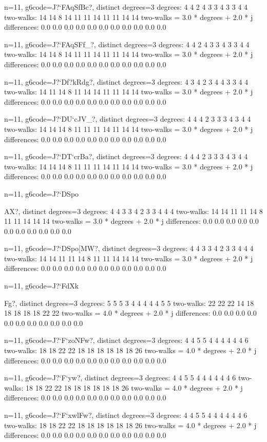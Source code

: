 {{{{{{{{{n=11, g6code=J?`FAqSfBc?, distinct degrees=3
degrees: 4 4 2 4 3 3 4 3 3 4 4 
two-walks: 14 14 8 14 11 11 14 11 11 14 14 
two-walks = 3.0 * degrees + 2.0 * j
differences: 0.0 0.0 0.0 0.0 0.0 0.0 0.0 0.0 0.0 0.0 0.0 

n=11, g6code=J?`FAqSFf_?, distinct degrees=3
degrees: 4 4 2 4 3 3 4 3 3 4 4 
two-walks: 14 14 8 14 11 11 14 11 11 14 14 
two-walks = 3.0 * degrees + 2.0 * j
differences: 0.0 0.0 0.0 0.0 0.0 0.0 0.0 0.0 0.0 0.0 0.0 

n=11, g6code=J?`Df?kRdg?, distinct degrees=3
degrees: 4 3 4 2 3 4 4 3 3 4 4 
two-walks: 14 11 14 8 11 14 14 11 11 14 14 
two-walks = 3.0 * degrees + 2.0 * j
differences: 0.0 0.0 0.0 0.0 0.0 0.0 0.0 0.0 0.0 0.0 0.0 

n=11, g6code=J?`DU`cJV_?, distinct degrees=3
degrees: 4 4 4 2 3 3 3 4 3 4 4 
two-walks: 14 14 14 8 11 11 11 14 11 14 14 
two-walks = 3.0 * degrees + 2.0 * j
differences: 0.0 0.0 0.0 0.0 0.0 0.0 0.0 0.0 0.0 0.0 0.0 

n=11, g6code=J?`DT`crBa?, distinct degrees=3
degrees: 4 4 4 2 3 3 3 4 3 4 4 
two-walks: 14 14 14 8 11 11 11 14 11 14 14 
two-walks = 3.0 * degrees + 2.0 * j
differences: 0.0 0.0 0.0 0.0 0.0 0.0 0.0 0.0 0.0 0.0 0.0 

n=11, g6code=J?`DSpo{AX?, distinct degrees=3
degrees: 4 4 3 3 4 2 3 3 4 4 4 
two-walks: 14 14 11 11 14 8 11 11 14 14 14 
two-walks = 3.0 * degrees + 2.0 * j
differences: 0.0 0.0 0.0 0.0 0.0 0.0 0.0 0.0 0.0 0.0 0.0 

n=11, g6code=J?`DSpo[MW?, distinct degrees=3
degrees: 4 4 3 3 4 2 3 3 4 4 4 
two-walks: 14 14 11 11 14 8 11 11 14 14 14 
two-walks = 3.0 * degrees + 2.0 * j
differences: 0.0 0.0 0.0 0.0 0.0 0.0 0.0 0.0 0.0 0.0 0.0 

n=11, g6code=J?`FdXk}Fg?, distinct degrees=3
degrees: 5 5 5 3 4 4 4 4 4 5 5 
two-walks: 22 22 22 14 18 18 18 18 18 22 22 
two-walks = 4.0 * degrees + 2.0 * j
differences: 0.0 0.0 0.0 0.0 0.0 0.0 0.0 0.0 0.0 0.0 0.0 

n=11, g6code=J?`F`zoNFw?, distinct degrees=3
degrees: 4 4 5 5 4 4 4 4 4 4 6 
two-walks: 18 18 22 22 18 18 18 18 18 18 26 
two-walks = 4.0 * degrees + 2.0 * j
differences: 0.0 0.0 0.0 0.0 0.0 0.0 0.0 0.0 0.0 0.0 0.0 

n=11, g6code=J?`F`yw\Fw?, distinct degrees=3
degrees: 4 4 5 5 4 4 4 4 4 4 6 
two-walks: 18 18 22 22 18 18 18 18 18 18 26 
two-walks = 4.0 * degrees + 2.0 * j
differences: 0.0 0.0 0.0 0.0 0.0 0.0 0.0 0.0 0.0 0.0 0.0 

n=11, g6code=J?`F`xwlFw?, distinct degrees=3
degrees: 4 4 5 5 4 4 4 4 4 4 6 
two-walks: 18 18 22 22 18 18 18 18 18 18 26 
two-walks = 4.0 * degrees + 2.0 * j
differences: 0.0 0.0 0.0 0.0 0.0 0.0 0.0 0.0 0.0 0.0 0.0 

}}}}}}}}}
